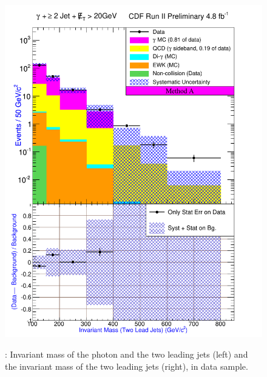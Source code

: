 \documentclass[11pt]{article}
\begin{document}
\begin{figure}[h!]
{ \includegraphics[scale=\resultsHistScale,keepaspectratio=true]{./g30jetmet20_MtdA_plot2_InvMass_j1j2.pdf}
}
 \caption{: Invariant mass of the photon and the two leading jets (left) and the invariant mass of the two leading jets (right), in \photwojetmettwenty data sample.}
 \label{fig:Result_MtdA_gj2Met20_Mass_gj1j2}
\end{figure}
\end{document}
